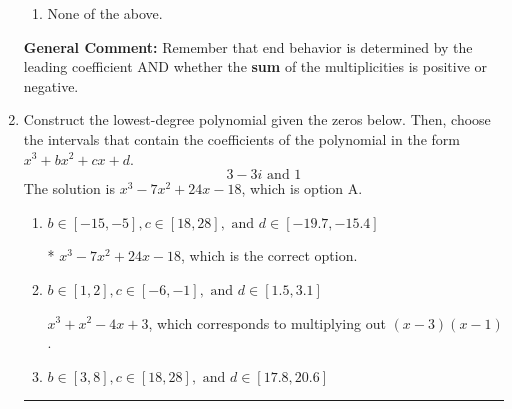 \documentclass{extbook}[14pt]
\newcommand{\litem}[1]{\item #1

\rule{\textwidth}{0.4pt}}
\begin{document}
\begin{enumerate}
{\begin{enumerate}[label=\Alph*.]
\item None of the above.\end{enumerate}
\textbf{General Comment:} Remember that end behavior is determined by the leading coefficient AND whether the \textbf{sum} of the multiplicities is positive or negative.
}
\litem{
Construct the lowest-degree polynomial given the zeros below. Then, choose the intervals that contain the coefficients of the polynomial in the form $x^3+bx^2+cx+d$.
\[ 3 - 3 i \text{ and } 1 \]
The solution is \( x^{3} -7 x^{2} +24 x -18 \), which is option A.\begin{enumerate}[label=\Alph*.]
\item \( b \in [-15, -5], c \in [18, 28], \text{ and } d \in [-19.7, -15.4] \)

* $x^{3} -7 x^{2} +24 x -18$, which is the correct option.
\item \( b \in [1, 2], c \in [-6, -1], \text{ and } d \in [1.5, 3.1] \)

$x^{3} + x^{2} -4 x + 3$, which corresponds to multiplying out $(x -3)(x -1)$.
\item \( b \in [3, 8], c \in [18, 28], \text{ and } d \in [17.8, 20.6] \)


\end{enumerate}}
\end{enumerate}
\end{document}
